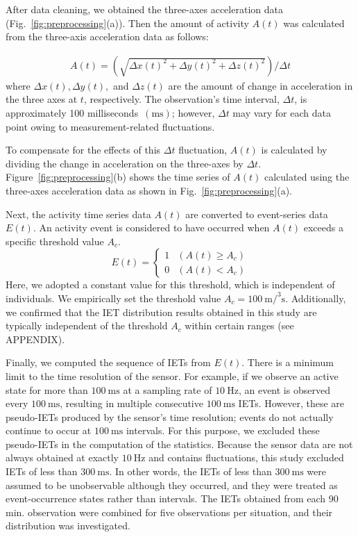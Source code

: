 \documentclass{bmcart}
\begin{document}
After data cleaning, we obtained the three-axes acceleration data (Fig.~\ref{fig:preprocessing}(a)).
Then the amount of activity $A(t)$ was calculated from the three-axis acceleration data as follows:

\begin{eqnarray}
A(t) = (\sqrt{\Delta x(t)^2+\Delta y(t)^2+\Delta z(t)^2})/\Delta t
\label{eq:a}
\end{eqnarray}
where $\Delta x(t), \Delta y(t),$ and $\Delta z(t)$ are the amount of change in acceleration in the three axes at $t$, respectively.
The observation's time interval, $\Delta t$, is approximately 100 milliseconds~$(\si{\milli\second})$; however, $\Delta t$ may vary for each data point owing to measurement-related ﬂuctuations. 

To compensate for the effects of this $\Delta t$ fluctuation, $A(t)$ is calculated by dividing the change in acceleration on the three-axes by $\Delta t$.
Figure~\ref{fig:preprocessing}(b) shows the time series of $A(t)$ calculated using the three-axes acceleration data as shown in  Fig.~\ref{fig:preprocessing}(a).

Next, the activity time series data $A(t)$ are converted to event-series data $E(t)$. An activity event is considered to have occurred when $A(t)$ exceeds a specific threshold value $A_c$.
\begin{equation}
    E(t) = \left\{
    \begin{array}{ll}
1 & (A(t) \geq A_c)\\
0 & (A(t) < A_c)
\end{array}
\right.
\end{equation}
Here, we adopted a constant value for this threshold, which is independent of individuals. 
We empirically set the threshold value $A_c=100~ \si{\metre\cubic\per\second}$. 
Additionally, we confirmed that the IET distribution results obtained in this study are typically independent of the threshold $A_c$ within certain ranges (see APPENDIX).

Finally, we computed the sequence of IETs from $E(t)$. 
There is a minimum limit to the time resolution of the sensor.
For example, if we observe an active state for more than $100~\si{\milli\second}$ at a sampling rate of $10~\si{\hertz}$, an event is observed every $100~\si{\milli\second}$, resulting in multiple consecutive $100~\si{\milli\second}$ IETs. 
However, these are pseudo-IETs produced by the sensor's time resolution; events do not actually continue to occur at $100~\si{\milli\second}$ intervals. 
For this purpose, we excluded these pseudo-IETs in the computation of the statistics. Because the sensor data are not always obtained at exactly $10~\si{\hertz}$ and contains fluctuations, this study excluded IETs of less than $300~\si{\milli\second}$.
In other words, the IETs of less than $300~\si{\milli\second}$ were assumed to be unobservable although they occurred, and they were treated as event-occurrence states rather than intervals. The IETs obtained from each 90 min. observation were combined for five observations per situation, and their distribution was investigated.
\end{document}
